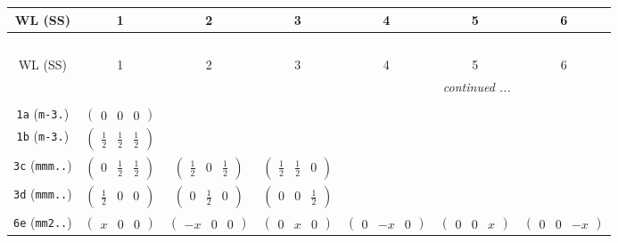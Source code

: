 \documentclass[fleqn,9pt,landscape]{jsarticle}
\begin{document}
\begin{center}
\renewcommand{\arraystretch}{1.2}
\begin{longtable}{ccccccc}
 \hline \hline
WL (SS) & 1 & 2 & 3 & 4 & 5 & 6 \\ \hline \endfirsthead

\multicolumn{6}{l}{\tablename\ \thetable{}} \\
 \hline \hline
WL (SS) & 1 & 2 & 3 & 4 & 5 & 6 \\ \hline \endhead

 \hline \hline
\multicolumn{6}{r}{\footnotesize\it continued ...} \\ \endfoot

 \hline \hline
\multicolumn{6}{r}{} \\ \endlastfoot

{\tt 1a} ({\tt m-3.}) & $ \begin{pmatrix} 0 & 0 & 0 \end{pmatrix} $ & $  $ & $  $ & $  $ & $  $ & $  $ \\ \hline
{\tt 1b} ({\tt m-3.}) & $ \begin{pmatrix} \frac{1}{2} & \frac{1}{2} & \frac{1}{2} \end{pmatrix} $ & $  $ & $  $ & $  $ & $  $ & $  $ \\ \hline
{\tt 3c} ({\tt mmm..}) & $ \begin{pmatrix} 0 & \frac{1}{2} & \frac{1}{2} \end{pmatrix} $ & $ \begin{pmatrix} \frac{1}{2} & 0 & \frac{1}{2} \end{pmatrix} $ & $ \begin{pmatrix} \frac{1}{2} & \frac{1}{2} & 0 \end{pmatrix} $ & $  $ & $  $ & $  $ \\ \hline
{\tt 3d} ({\tt mmm..}) & $ \begin{pmatrix} \frac{1}{2} & 0 & 0 \end{pmatrix} $ & $ \begin{pmatrix} 0 & \frac{1}{2} & 0 \end{pmatrix} $ & $ \begin{pmatrix} 0 & 0 & \frac{1}{2} \end{pmatrix} $ & $  $ & $  $ & $  $ \\ \hline
{\tt 6e} ({\tt mm2..}) & $ \begin{pmatrix} x & 0 & 0 \end{pmatrix} $ & $ \begin{pmatrix} - x & 0 & 0 \end{pmatrix} $ & $ \begin{pmatrix} 0 & x & 0 \end{pmatrix} $ & $ \begin{pmatrix} 0 & - x & 0 \end{pmatrix} $ & $ \begin{pmatrix} 0 & 0 & x \end{pmatrix} $ & $ \begin{pmatrix} 0 & 0 & - x \end{pmatrix} $ \\ \hline

\end{longtable}
\end{center}
\end{document}
